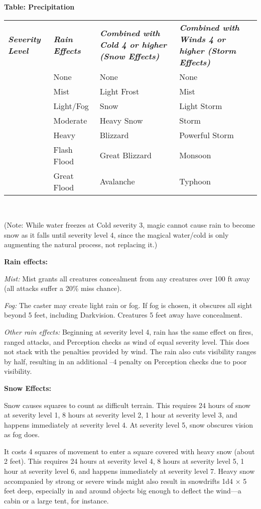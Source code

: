 {	{\textbf{Table: Precipitation}\small\\
		\begin{tabularx}{\columnwidth}{>{\centering}X>{\centering}X>{\centering}X>{\centering}X}
			\rowcolor{gray!50}
			\textbf{\textit{Severity Level}} &  \textbf{\textit{Rain Effects}} & \textbf{\textit{Combined with Cold 4 or higher (Snow Effects)}} & \textbf{\textit{Combined with Winds 4 or higher (Storm Effects)}} \tabularnewline
			1	& None			& None			& None			\tabularnewline
			2	& Mist			& Light Frost	& Mist			\tabularnewline
			3	& Light/Fog		& Snow			& Light Storm	\tabularnewline
			4	& Moderate		& Heavy Snow	& Storm			\tabularnewline
			5	& Heavy			& Blizzard		& Powerful Storm\tabularnewline
			6	& Flash Flood	& Great Blizzard& Monsoon		\tabularnewline
			7	& Great Flood	& Avalanche		& Typhoon
		\end{tabularx}}\\\par
	\par (Note: While water freezes at Cold severity 3, magic cannot cause rain to become snow as it falls until severity level 4, since the magical water/cold is only augmenting the natural process, not replacing it.)
	\par \textbf{Rain effects:}
	\par \textit{Mist:} Mist grants all creatures concealment from any creatures over 100 ft away (all attacks suffer a 20\% miss chance).
	\par \textit{Fog:} The caster may create light rain or fog. If fog is chosen, it obscures all sight beyond 5 feet, including Darkvision. Creatures 5 feet away have concealment.
	\par \textit{Other rain effects:} Beginning at severity level 4, rain has the same effect on fires, ranged attacks, and Perception checks as wind of equal severity level. This does not stack with the penalties provided by wind. The rain also cuts visibility ranges by half, resulting in an additional –4 penalty on Perception checks due to poor visibility.
	\par \textbf{Snow Effects:}
	\par Snow causes squares to count as difficult terrain. This requires 24 hours of snow at severity level 1, 8 hours at severity level 2, 1 hour at severity level 3, and happens immediately at severity level 4. At severity level 5, snow obscures vision as fog does.
	\par It costs 4 squares of movement to enter a square covered with heavy snow (about 2 feet). This requires 24 hours at severity level 4, 8 hours at severity level 5, 1 hour at severity level 6, and happens immediately at severity level 7. Heavy snow accompanied by strong or severe winds might also result in snowdrifts 1d4 × 5 feet deep, especially in and around objects big enough to deflect the wind---a cabin or a large tent, for instance.
}

